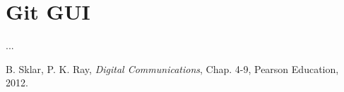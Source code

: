 \documentclass[a4paper,portrait,10pt]{article}   %
\begin{document}
\section{Git GUI}   \label{sec:GitGui}
...
  

\begin{thebibliography}{99} %

 B. Sklar, P. K. Ray, \textit{Digital Communications}, Chap. 4-9, Pearson Education, 2012.
 
\end{thebibliography}







\end{document}
